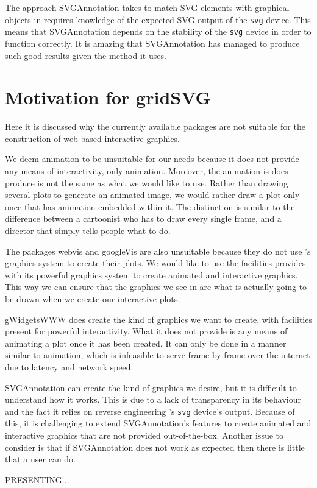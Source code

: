 The approach \textsf{SVGAnnotation} takes to match SVG elements with graphical objects in \R{} requires knowledge of the expected SVG output of the \texttt{svg} device.
This means that \textsf{SVGAnnotation} depends on the stability of the \texttt{svg} device in order to function correctly.
It is amazing that \textsf{SVGAnnotation} has managed to produce such good results given the method it uses.

\section{Motivation for \textsf{gridSVG}}

Here it is discussed why the currently available \R{} packages are not suitable for the construction of web-based interactive graphics.

We deem \textsf{animation} to be unsuitable for our needs because it does not provide any means of interactivity, only animation.
Moreover, the animation is does produce is not the same as what we would like to use.
Rather than drawing several plots to generate an animated image, we would rather draw a plot only once that has animation embedded within it.
The distinction is similar to the difference between a cartoonist who has to draw every single frame, and a director that simply tells people what to do.

The packages \textsf{webvis} and \textsf{googleVis} are also unsuitable because they do not use \R{}'s graphics system to create their plots.
We would like to use the facilities \R{} provides with its powerful graphics system to create animated and interactive graphics.
This way we can ensure that the graphics we see in \R{} are what is actually going to be drawn when we create our interactive plots.

\textsf{gWidgetsWWW} does create the kind of graphics we want to create, with facilities present for powerful interactivity.
What it does not provide is any means of animating a plot once it has been created.
It can only be done in a manner similar to \textsf{animation}, which is infeasible to serve frame by frame over the internet due to latency and network speed.

\textsf{SVGAnnotation} can create the kind of graphics we desire, but it is difficult to understand how it works.
This is due to a lack of transparency in its behaviour and the fact it relies on reverse engineering \R{}'s \texttt{svg} device's output.
Because of this, it is challenging to extend \textsf{SVGAnnotation}'s features to create animated and interactive graphics that are not provided out-of-the-box.
Another issue to consider is that if \textsf{SVGAnnotation} does not work as expected then there is little that a user can do.

PRESENTING... \gridSVG{}

